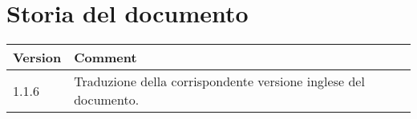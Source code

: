 \chapter{Storia del documento}

\begin{tabular}{|p{}|p{}|}
\hline 
Version&
Comment\tabularnewline
\hline
\hline 
1.1.6&
Traduzione della corrispondente versione inglese del documento.\tabularnewline
\hline
\end{tabular}
